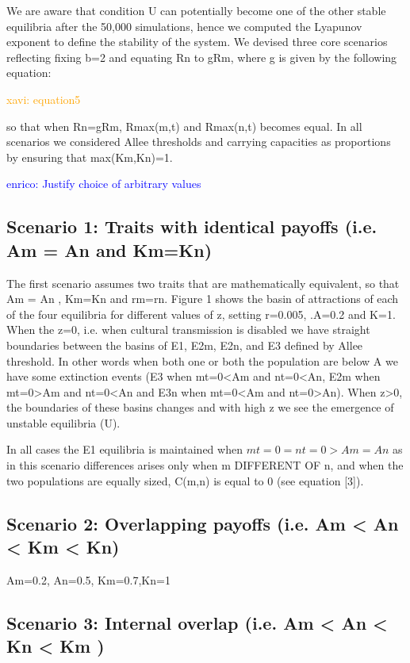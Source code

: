 \documentclass[preprint,authoryear]{elsarticle}
\newcommand{\memo}[2]{\textcolor{#1}{#2}}
\newcommand{\xavi}[1]{\memo{orange}{xavi: #1\\}}
\newcommand{\enrico}[1]{\memo{blue}{enrico: #1\\}}
\begin{document}
We are aware that condition U can potentially become one of the other stable equilibria after the 50,000 simulations, hence we computed the Lyapunov exponent to define the stability of the system. We devised three core scenarios reflecting fixing b=2 and equating Rn to gRm, where g is given by the following equation:

\xavi{equation5}

so that when Rn=gRm,  Rmax(m,t) and Rmax(n,t) becomes equal. In all scenarios we considered Allee thresholds and carrying capacities as proportions by ensuring that max(Km,Kn)=1.

\enrico{Justify choice of arbitrary values}

\subsection{Scenario 1: Traits with identical payoffs (i.e. Am = An   and Km=Kn)}

The first scenario assumes two traits that are mathematically equivalent, so that  Am = An
, Km=Kn and rm=rn. Figure 1 shows the basin of attractions of each of the four equilibria for different values of z, setting r=0.005, .A=0.2 and K=1. When the z=0, i.e. when cultural transmission is disabled we have straight boundaries between the basins of E1, E2m, E2n, and E3 defined by Allee threshold. In other words when both one or both the population are below A we have some extinction events (E3 when mt=0<Am and nt=0<An, E2m when mt=0>Am and nt=0<An and E3n when mt=0<Am and nt=0>An). When z>0, the boundaries of these basins changes and with high z we see the emergence of unstable equilibria (U). 


In all cases the E1 equilibria is maintained when $mt=0=nt=0 > Am=An$ as in this scenario differences arises only when m DIFFERENT OF n, and when the two populations are equally sized, C(m,n) is equal to 0 (see equation [3]).  

\subsection{Scenario 2: Overlapping payoffs (i.e.  Am <  An  < Km < Kn)}

Am=0.2, An=0.5, Km=0.7,Kn=1

\subsection{Scenario 3: Internal overlap  (i.e.  Am <  An < Kn <  Km )}
\end{document}
